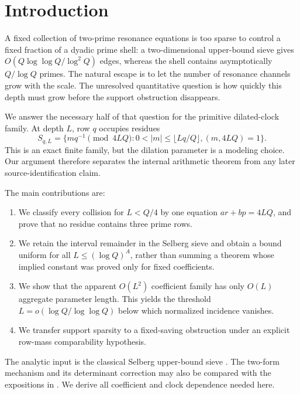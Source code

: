 \section{Introduction}

A fixed collection of two-prime resonance equations is too sparse to control a
fixed fraction of a dyadic prime shell: a two-dimensional upper-bound sieve
gives \(O(Q\log\log Q/\log^2Q)\) edges, whereas the shell contains
asymptotically \(Q/\log Q\) primes.  The natural escape is to let the number of
resonance channels grow with the scale.  The unresolved quantitative question
is how quickly this depth must grow before the support obstruction disappears.

We answer the necessary half of that question for the primitive dilated-clock
family.  At depth \(L\), row \(q\) occupies residues
\[
 S_{q,L}=\{mq^{-1}\pmod{4LQ}:0<|m|\le\lfloor Lq/Q\rfloor,
 (m,4LQ)=1\}.
\]
This is an exact finite family, but the dilation parameter is a modeling
choice.  Our argument therefore separates the internal arithmetic theorem from
any later source-identification claim.

The main contributions are:
\begin{enumerate}
\item We classify every collision for \(L<Q/4\) by one equation
      \(ar+bp=4LQ\), and prove that no residue contains three prime rows.
\item We retain the interval remainder in the Selberg sieve and obtain a bound
      uniform for all \(L\le(\log Q)^A\), rather than summing a theorem whose
      implied constant was proved only for fixed coefficients.
\item We show that the apparent \(O(L^2)\) coefficient family has only
      \(O(L)\) aggregate parameter length.  This yields the threshold
      \(L=o(\log Q/\log\log Q)\) below which normalized incidence vanishes.
\item We transfer support sparsity to a fixed-saving obstruction under an
      explicit row-mass comparability hypothesis.
\end{enumerate}

The analytic input is the classical Selberg upper-bound sieve
\cite{HalberstamRichert1974,IwaniecKowalski2004}.  The two-form mechanism and
its determinant correction may also be compared with the expositions in
\cite{GreenAdditive,Rudnick2015}.  We derive all coefficient and clock
dependence needed here.

